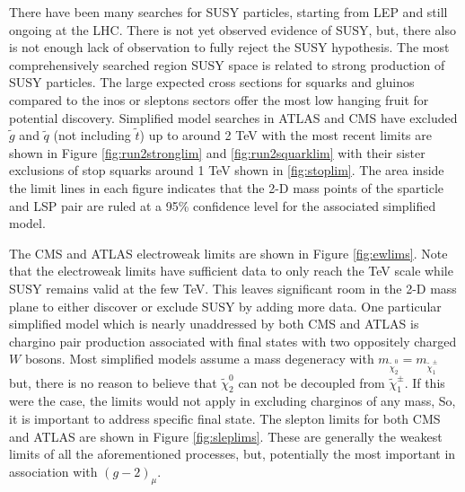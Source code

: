 There have been many searches for SUSY particles, starting from  LEP and still ongoing at the LHC. There is not yet observed evidence of SUSY, but, there also is not enough lack of observation to fully reject the SUSY hypothesis. The most comprehensively searched region SUSY space is related to strong production of SUSY particles. The large expected cross sections for squarks and gluinos compared to the inos or sleptons sectors offer the most low hanging fruit for potential discovery.
Simplified model searches in ATLAS and CMS have excluded $\tilde{g}$ and $\tilde{q}$ (not including $\tilde{t}$) up to around 2 TeV with the most recent limits are shown in Figure \ref{fig:run2stronglim} and \ref{fig:run2squarklim} with their sister exclusions of stop squarks around 1 TeV shown in \ref{fig:stoplim}. The area inside the limit lines in each figure indicates that the 2-D mass points of the sparticle and LSP pair are ruled at a 95\% confidence level for the associated simplified model.



The CMS and ATLAS electroweak limits are shown in Figure \ref{fig:ewlims}. Note that the electroweak limits have sufficient data to only reach the TeV scale while SUSY remains valid at the few TeV. This leaves significant room in the 2-D mass plane to either discover or exclude SUSY by adding more data. One particular simplified model which is nearly unaddressed by both CMS and ATLAS is chargino pair production associated with final states with two oppositely charged $W$ bosons.  Most simplified models assume a mass degeneracy with $m_{\tilde{\chi}^0_2} = m_{\tilde{\chi}^\pm_1}$ but, there is no reason to believe that $\tilde{\chi}^0_2$ can not be decoupled from $\tilde{\chi}^\pm_1$. If this were the case, the limits would not apply in excluding charginos of any mass, So, it is important to address specific final state. The slepton limits  for both CMS and ATLAS are shown in Figure \ref{fig:sleplims}. These are generally the weakest limits of all the aforementioned processes, but, potentially the most important in association with $(g-2)_\mu$.



